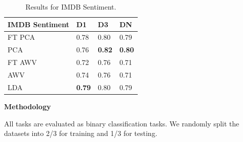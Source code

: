 \begin{table}[t]
	\centering
	\setlength{\tabcolsep}{10pt}
	\begin{tabular}{llll}
		
		\textbf{IMDB Sentiment} & D1   & D3   & DN   \\
		\toprule{}
		FT PCA         & 0.78 & 0.80 & 0.79 \\
		PCA            & 0.76 & \textbf{0.82} & \textbf{0.80} \\
		FT AWV         & 0.72 & 0.76 & 0.71 \\
		AWV            & 0.74 & 0.76 & 0.71 \\
		LDA            & \textbf{0.79} & 0.80 & 0.79 \\
		
	\end{tabular}
	\caption{Results for IMDB Sentiment. \label{tabSentiment}}
	
\end{table}

 




\noindent \textbf{Methodology} 

All tasks are evaluated as binary classification tasks. We randomly split the datasets into 2/3 for training and 1/3 for testing. 



